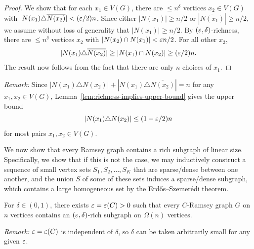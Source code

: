 \begin{proof}
  We show that for each $x_1 \in V(G)$, there are $\leq n^{\delta}$ vertices $x_2 \in V(G)$ with $|N(x_1) \triangle \overline{N(x_2)}| < (\varepsilon/2)n$. Since either $|N(x_1)| \geq n/2$ or $|\overline{N(x_1)}| \geq n/2$, we assume without loss of generality that $|N(x_1)| \geq n/2$. By $(\varepsilon, \delta)$-richness, there are $\leq n^{\delta}$ vertices $x_2$ with $|N(x_2) \cap N(x_1)| < \varepsilon n/2$. For all other $x_2$, 
  \[
    |N(x_1) \triangle \overline{N(x_2)}| \geq |N(x_1) \cap N(x_2)|  \geq (\varepsilon/2) n.
  \]
  The result now follows from the fact that there are only $n$ choices of $x_1$.
\end{proof}

\textit{Remark:} Since $|N(x_1) \triangle N(x_2)| + |N(x_1) \triangle \overline{N(x_2)}| = n$ for any $x_1, x_2 \in V(G)$, Lemma~\ref{lem:richness-implies-upper-bound} gives the upper bound
\[
  |N(x_1) \triangle N(x_2)| \leq (1 - \varepsilon/2)n
\]  
for most pairs $x_1, x_2 \in V(G)$.

We now show that every Ramsey graph contains a rich subgraph of linear size. Specifically, we show that if this is not the case, we may inductively construct a sequence of small vertex sets $S_1, S_2, \ldots, S_K$ that are sparse/dense between one another, and the union $S$ of some of these sets induces a sparse/dense subgraph, which contains a large homogeneous set by the Erd\H{o}s--Szemer\'{e}di theorem.

\begin{lemma}
  \label{lem:rich-subgraph}

  For $\delta \in (0, 1)$, there exists $\varepsilon = \varepsilon(C) > 0$ such that every $C$-Ramsey graph $G$ on $n$ vertices contains an $(\varepsilon, \delta)$-rich subgraph on $\Omega(n)$ vertices.
\end{lemma}

\textit{Remark:} $\varepsilon = \varepsilon(C)$ is independent of $\delta$, so $\delta$ can be taken arbitrarily small for any given $\varepsilon$.

